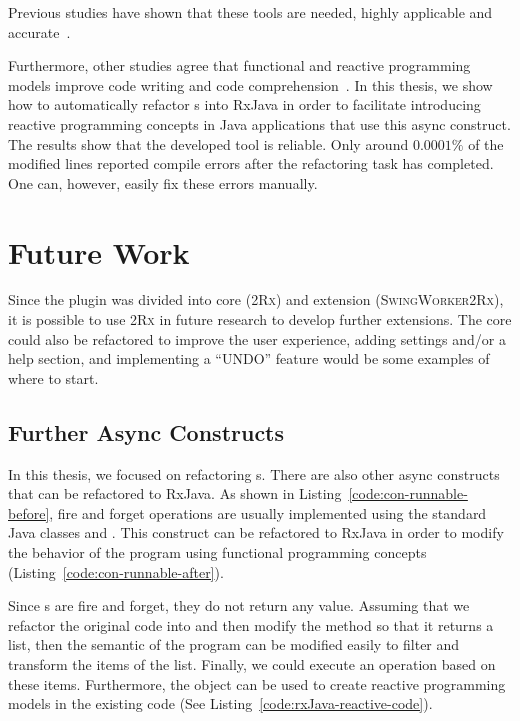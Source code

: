 \documentclass[type=bsc,accentcolor=tud9c]{tudthesis}
\newcommand{\framework}[1]{\textcolor{black!65}{#1}}
\newcommand{\toolcore}{\textsc{2Rx}}
\newcommand{\toolextension}{\textsc{SwingWorker2Rx}}
\begin{document}
Previous studies have shown that these tools are needed, highly applicable and accurate~\cite{paperAsyncMobile, paperStudyRefactoring, thesisJavaScript}.

Furthermore, other studies agree that functional and reactive programming models improve code writing and code comprehension~\cite{promises, paperReactiveComprehension}. In this thesis, we show how to automatically refactor s into \framework{RxJava} in order to facilitate introducing reactive programming concepts in \framework{Java} applications that use this async construct. The results show that the developed tool is reliable. Only around $0.0001\%$ of the modified lines reported compile errors after the refactoring task has completed. One can, however, easily fix these errors manually.

\section{Future Work}

Since the plugin was divided into core (\toolcore{}) and extension (\toolextension{}), it is possible to use \toolcore{} in future research to develop further extensions. The core could also be refactored to improve the user experience, adding settings and/or a help section, and implementing a ``UNDO'' feature would be some examples of where to start.

\subsection{Further Async Constructs}
In this thesis, we focused on refactoring s. There are also other async constructs that can be refactored to \framework{RxJava}. As shown in Listing~\ref{code:con-runnable-before}, fire and forget operations are usually implemented using the standard \framework{Java} classes  and . This construct can be refactored to \framework{RxJava} in order to modify the behavior of the program using functional programming concepts (Listing~\ref{code:con-runnable-after}).

Since s are fire and forget, they do not return any value. Assuming that we refactor the original code into  and then modify the method  so that it returns a list, then the semantic of the program can be modified easily to filter and transform the items of the list. Finally, we could execute an operation based on these items. Furthermore, the  object can be used to create reactive programming models in the existing code (See Listing~\ref{code:rxJava-reactive-code}).
\end{document}

